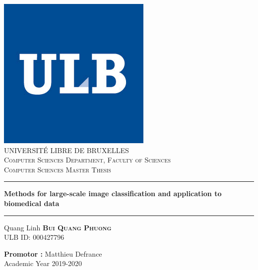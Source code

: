 \documentclass[11pt, openany]{report}
\theoremstyle{plain}
\theoremstyle{definition}
\theoremstyle{remark}
\begin{document}
\begin{titlepage}
  \begin{sffamily}
  \begin{center}

    \includegraphics[scale=0.4]{figures/logo_ulb.jpg}~\\[1cm]
    
	\textsc{\LARGE UNIVERSITÉ LIBRE DE BRUXELLES}\\[0.5cm]
    \textsc{\LARGE Computer Sciences Department, Faculty of Sciences}\\[2cm]
    \textsc{\LARGE Computer Sciences Master Thesis}\\[2cm]

    \hrule width 15cm
    \vspace{0.5cm}
    { \huge \bfseries Methods for large-scale image classification and application to biomedical data}
    \vspace{0.5cm}
	\hrule width 15cm
	\vspace{1cm}
	
	
	\LARGE Quang Linh \textsc{\textbf{\LARGE Bui Quang Phuong}} \\ [0.5cm]
	\large ULB ID: 000427796 
	
    \vfill

    {\large \textbf{Promotor :} Matthieu Defrance} \\
    \vspace{0.5cm}
    Academic Year 2019-2020

  \end{center}
  \end{sffamily}
\end{titlepage}
\end{document}

